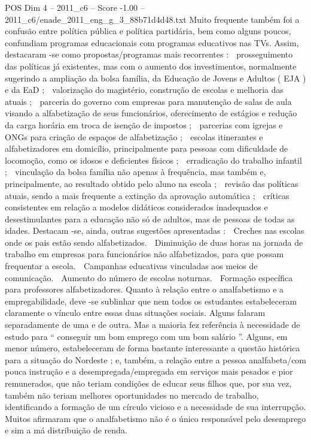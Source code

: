 \begin{textsample}{POS Dim 4 – 2011\_c6 – Score -1.00 – 2011\_c6/enade\_2011\_eng\_g\_3\_88b71d4d48.txt}
Muito frequente também foi a confusão entre política pública e política partidária, bem como alguns poucos, confundiam programas educacionais com programas educativos nas TVs.
Assim, destacaram -se como propostas/programas mais recorrentes :  prosseguimento das políticas já existentes, mas com o aumento dos investimentos, normalmente sugerindo a ampliação da bolsa família, da Educação de Jovens e Adultos ( EJA ) e da EaD ;  valorização do magistério, construção de escolas e melhoria das atuais ;  parceria do governo com empresas para manutenção de salas de aula visando a alfabetização de seus funcionários, oferecimento de estágios e redução da carga horária em troca de isenção de impostos ;  parcerias com igrejas e ONGs para criação de espaços de alfabetização ;  escolas itinerantes e alfabetizadores em domicílio, principalmente para pessoas com dificuldade de locomoção, como os idosos e deficientes físicos ;  erradicação do trabalho infantil ;  vinculação da bolsa família não apenas à frequência, mas também e, principalmente, ao resultado obtido pelo aluno na escola ;  revisão das políticas atuais, sendo a mais frequente a extinção da aprovação automática ;  críticas consistentes em relação a modelos didáticos considerados inadequados e desestimulantes para a educação não só de adultos, mas de pessoas de todas as idades.
Destacam -se, ainda, outras sugestões apresentadas :  Creches nas escolas onde os pais estão sendo alfabetizados.  Diminuição de duas horas na jornada de trabalho em empresas para funcionários não alfabetizados, para que possam frequentar a escola.  Campanhas educativas vinculadas aos meios de comunicação.  Aumento do número de escolas noturnas.  Formação específica para professores alfabetizadores.
Quanto à relação entre o analfabetismo e a empregabilidade, deve -se sublinhar que nem todos os estudantes estabeleceram claramente o vínculo entre essas duas situações sociais.
Alguns falaram separadamente de uma e de outra.
Mas a maioria fez referência à necessidade de estudo para “ conseguir um bom emprego com um bom salário ”.
Alguns, em menor número, estabeleceram de forma bastante interessante a questão histórica para a situação do Nordeste ; e, também, a relação entre a pessoa analfabeta/com pouca instrução e a desempregada/empregada em serviços mais pesados e pior remunerados, que não teriam condições de educar seus filhos que, por sua vez, também não teriam melhores oportunidades no mercado de trabalho, identificando a formação de um círculo vicioso e a necessidade de sua interrupção.
Muitos afirmaram que o analfabetismo não é o único responsável pelo desemprego e sim a má distribuição de renda.

\end{textsample}
